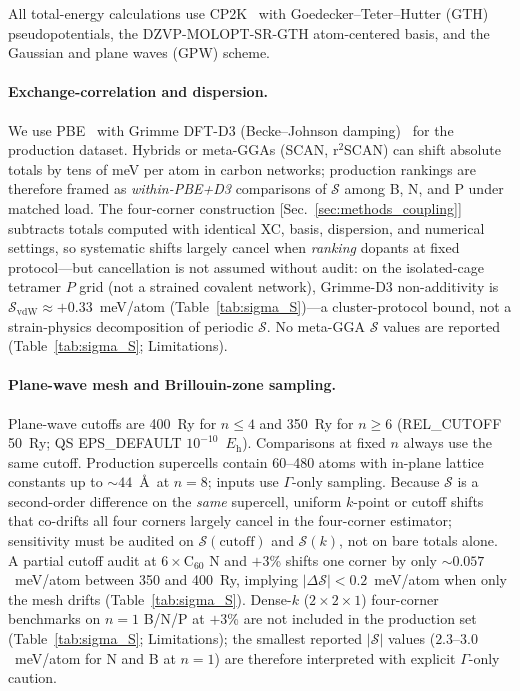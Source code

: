 \documentclass[%
 reprint,
 groupedaddress,
 amsmath,amssymb,
 aps,
 prb,
 floatfix,
]{revtex4-2}
\begin{document}
All total-energy calculations use CP2K~\cite{VandeVondele2005quickstep} with Goedecker--Teter--Hutter (GTH) pseudopotentials, the DZVP-MOLOPT-SR-GTH atom-centered basis, and the Gaussian and plane waves (GPW) scheme.

\paragraph{Exchange-correlation and dispersion.}
We use PBE~\cite{Perdew1996generalized} with Grimme DFT-D3 (Becke--Johnson damping)~\cite{Grimme2011effect} for the production dataset.
Hybrids or meta-GGAs (SCAN, r$^2$SCAN) can shift absolute totals by tens of meV per atom in carbon networks; production rankings are therefore framed as \emph{within-PBE+D3} comparisons of $\mathcal{S}$ among B, N, and P under matched load.
The four-corner construction [Sec.~\ref{sec:methods_coupling}] subtracts totals computed with identical XC, basis, dispersion, and numerical settings, so systematic shifts largely cancel when \emph{ranking} dopants at fixed protocol---but cancellation is not assumed without audit: on the isolated-cage tetramer $P$ grid (not a strained covalent network), Grimme-D3 non-additivity is $\mathcal{S}_{\mathrm{vdW}}\approx +0.33$~meV/atom (Table~\ref{tab:sigma_S})---a cluster-protocol bound, not a strain-physics decomposition of periodic $\mathcal{S}$.
No meta-GGA $\mathcal{S}$ values are reported (Table~\ref{tab:sigma_S}; Limitations).

\paragraph{Plane-wave mesh and Brillouin-zone sampling.}
Plane-wave cutoffs are 400~Ry for $n\leq 4$ and 350~Ry for $n\geq 6$ (REL\_CUTOFF 50~Ry; QS EPS\_DEFAULT $10^{-10}$~$E_{\mathrm{h}}$).
Comparisons at fixed $n$ always use the same cutoff.
Production supercells contain 60--480 atoms with in-plane lattice constants up to ${\sim}44$~\AA\ at $n{=}8$; inputs use $\Gamma$-only sampling.
Because $\mathcal{S}$ is a second-order difference on the \emph{same} supercell, uniform $k$-point or cutoff shifts that co-drifts all four corners largely cancel in the four-corner estimator; sensitivity must be audited on $\mathcal{S}(\mathrm{cutoff})$ and $\mathcal{S}(k)$, not on bare totals alone.
A partial cutoff audit at $6\times\mathrm{C}_{60}$ N and $+3$\% shifts one corner by only ${\sim}0.057$~meV/atom between 350 and 400~Ry, implying $|\Delta\mathcal{S}|<0.2$~meV/atom when only the mesh drifts (Table~\ref{tab:sigma_S}).
Dense-$k$ ($2\times 2\times 1$) four-corner benchmarks on $n{=}1$ B/N/P at $+3$\% are not included in the production set (Table~\ref{tab:sigma_S}; Limitations); the smallest reported $|\mathcal{S}|$ values ($2.3$--$3.0$~meV/atom for N and B at $n{=}1$) are therefore interpreted with explicit $\Gamma$-only caution.
\end{document}
